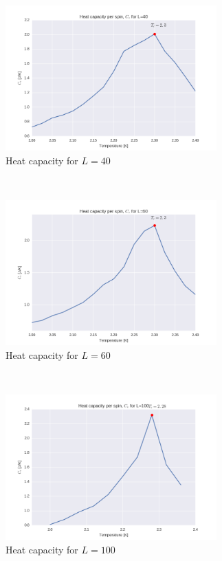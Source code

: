 \documentclass[a4paper, 10pt]{article}
\begin{document}
\begin{figure}[!ht]
    \centering
    \begin{subfigure}[H!]{0.5\textwidth}
        \centering
        \includegraphics[height=2.2in]{cvl40Ne5New.png}
        \caption{Heat capacity for $L=40$}
    \end{subfigure}%
    ~ 
    \begin{subfigure}[H!]{0.5\textwidth}
        \centering
        \includegraphics[height=2.2in]{cvl60Ne5New.png}
        \caption{Heat capacity for $L=60$}
    \end{subfigure}
        ~
     \begin{subfigure}[H!]{0.5\textwidth}
        \centering
        \includegraphics[height=2.2in]{cvl100Ne5New.png}
        \caption{Heat capacity for $L=100$}
    \end{subfigure}%
    ~ 
    \begin{subfigure}[H!]{0.5\textwidth}

\end{subfigure}
\end{figure}
\end{document}
